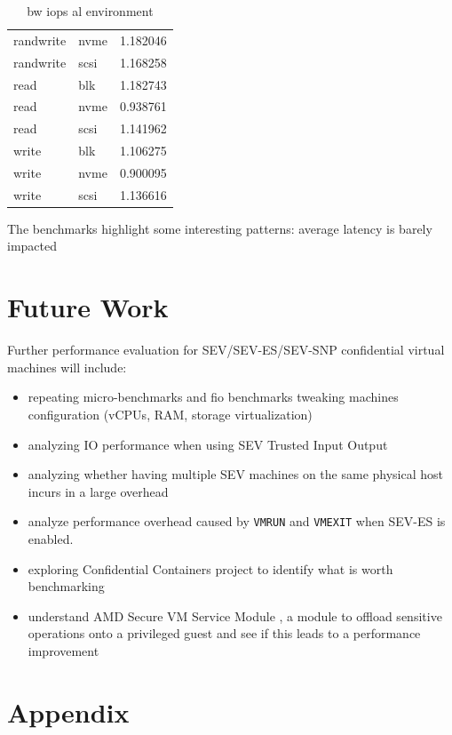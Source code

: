 \documentclass[twocolumn]{article}
\begin{document}
\begin{table}
\begin{tabular}{llr}
        randwrite & nvme & 1.182046 \\
        randwrite & scsi & 1.168258 \\
        read & blk & 1.182743 \\
        read & nvme & 0.938761 \\
        read & scsi & 1.141962 \\
        write & blk & 1.106275 \\
        write & nvme & 0.900095 \\
        write & scsi & 1.136616 \\
        \hline
    \end{tabular}
    \caption{bw iops al environment}
\end{table}



The benchmarks highlight some interesting patterns: average latency is barely impacted

\section{Future Work}
Further performance evaluation for SEV/SEV-ES/SEV-SNP confidential virtual machines will include:

\begin{itemize}
    \item repeating micro-benchmarks and fio benchmarks tweaking machines configuration (vCPUs, RAM, storage virtualization)
    \item analyzing IO performance when using SEV Trusted Input Output \cite{tio}
    \item analyzing whether having multiple SEV machines on the same physical host incurs in a large overhead
    \item analyze performance overhead caused by \texttt{VMRUN} and \texttt{VMEXIT} when SEV-ES is enabled.
    \item exploring Confidential Containers \cite{coco} project to identify what is worth benchmarking
    \item understand AMD Secure VM Service Module \cite{svsm}, a module to offload sensitive operations onto a privileged guest and see if this leads to a performance improvement
\end{itemize}

\printbibliography
\appendix
\section*{Appendix}
\end{document}
